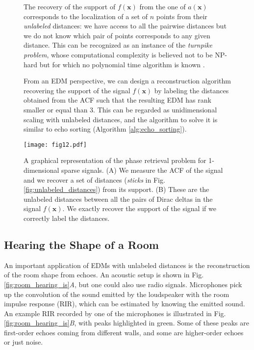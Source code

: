 \documentclass[10pt,double]{IEEEtran}
\renewcommand{\vec}[1]{\ensuremath{\boldsymbol{#1}}}
\providecommand{\vx}{\vec{x}} \providecommand{\vy}{\vec{y}}
\begin{document}
\begin{figure*}[t]
\begin{spmagbox}
\begin{multicols}{2}
The recovery of the support of $f(\vx)$ from the one of $a(\vx)$ corresponds
to the localization of a set of $n$ points from their \emph{unlabeled}
distances: we have access to all the pairwise distances but we do not know
which pair of points corresponds to any given distance. This can be recognized
as an instance of the \emph{turnpike problem}, whose computational complexity
is believed not to be NP-hard but for which no polynomial time algorithm is
known \cite{Lemke:2002um}.

From an EDM perspective, we can design a reconstruction algorithm recovering
the support of the signal $f(\vx)$ by labeling the distances obtained from the
ACF such that the resulting EDM has rank smaller or equal than 3. This can be
regarded as unidimensional scaling with unlabeled distances, and the algorithm
to solve it is similar to echo sorting (Algorithm \ref{alg:echo_sorting}).


\vspace{5mm}

\texttt{[image: fig12.pdf]}

\caption{\selectfont A graphical representation of the phase retrieval problem for
1-dimensional sparse signals. (A) We measure the ACF of the signal and we
recover a set of distances (\emph{sticks} in Fig.
\ref{fig:unlabeled_distances}) from its support. (B) These are the unlabeled
distances between all the pairs of Dirac deltas in the signal $f(\vx)$. We
exactly recover the support of the signal if we correctly label the distances.}

\end{multicols}
\end{spmagbox}
\end{figure*}

\subsection{Hearing the Shape of a Room } \label{sub:hearing_the_shape_of_a_room}

An important application of EDMs with unlabeled distances is the
reconstruction of the room shape from echoes. An acoustic setup is shown in
Fig. \ref{fig:room_hearing_is}\textsl{A}, but one could also use radio
signals. Microphones pick up the convolution of the sound emitted by the
loudspeaker with the room impulse response (RIR), which can be estimated by
knowing the emitted sound. An example RIR recorded by one of the microphones
is illustrated in Fig.
\ref{fig:room_hearing_is}\textsl{B}, with peaks highlighted in green.
Some of these peaks are first-order echoes coming from different walls, and
some are higher-order echoes or just noise.
\end{document}
